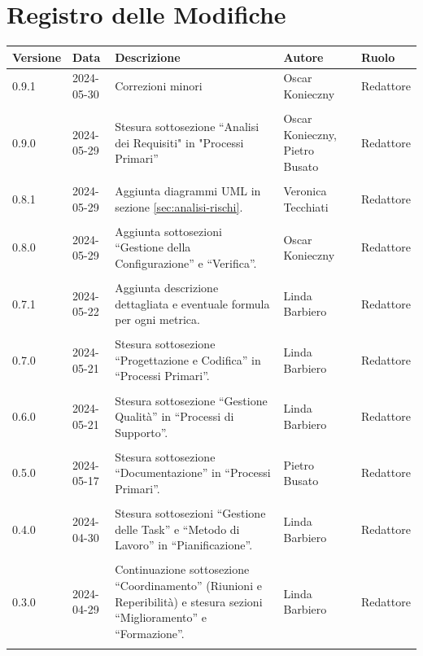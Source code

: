 \documentclass[8pt]{article}
\begin{document}
\section*{Registro delle Modifiche}
\begin{table}[ht!]	
	\centering
	\begin{tabular}{p{1.2cm} p{2cm} p{6cm} p{3cm} p{2cm}}
		\toprule
		\textbf{Versione}& \textbf{Data} & \textbf{Descrizione} & \textbf{Autore} & \textbf{Ruolo} \\
		\midrule
		0.9.1 & 2024-05-30 & Correzioni minori & Oscar Konieczny & Redattore \\\\
		0.9.0 & 2024-05-29 & Stesura sottosezione ``Analisi dei Requisiti" in "Processi Primari'' & Oscar Konieczny, Pietro Busato & Redattore \\\\ 
        0.8.1 & 2024-05-29 & Aggiunta diagrammi UML in sezione \ref{sec:analisi-rischi}. & Veronica Tecchiati & Redattore \\\\
		0.8.0 & 2024-05-29 & Aggiunta sottosezioni ``Gestione della Configurazione'' e ``Verifica''. & Oscar Konieczny & Redattore \\\\
		0.7.1 & 2024-05-22 & Aggiunta descrizione dettagliata e eventuale formula per ogni metrica. & Linda Barbiero & Redattore \\\\ %
		0.7.0 & 2024-05-21 & Stesura sottosezione ``Progettazione e Codifica'' in ``Processi Primari''. & Linda Barbiero & Redattore \\\\ %
		0.6.0 & 2024-05-21 & Stesura sottosezione ``Gestione Qualità'' in ``Processi di Supporto''. & Linda Barbiero & Redattore \\\\ %
		0.5.0 & 2024-05-17 & Stesura sottosezione ``Documentazione'' in ``Processi Primari''. & Pietro Busato & Redattore \\\\ %
		0.4.0 & 2024-04-30 & Stesura sottosezioni ``Gestione delle Task'' e ``Metodo di Lavoro'' in ``Pianificazione''. & Linda Barbiero & Redattore \\\\ %
		0.3.0 & 2024-04-29 & Continuazione sottosezione ``Coordinamento'' (Riunioni e Reperibilità) e stesura sezioni ``Miglioramento'' e ``Formazione''. & Linda Barbiero & Redattore \\\\ %

\end{tabular}
\end{table}
\end{document}
